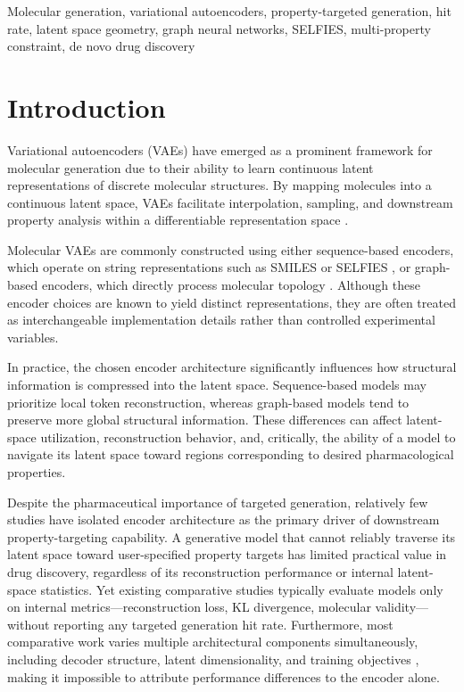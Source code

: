 \documentclass[conference]{IEEEtran}
\begin{document}
\begin{IEEEkeywords}
Molecular generation, variational autoencoders, property-targeted generation, hit rate, latent space geometry, graph neural networks, SELFIES, multi-property constraint, de novo drug discovery
\end{IEEEkeywords}

\section{Introduction}

Variational autoencoders (VAEs) \cite{vae_original_citation} have emerged as a prominent framework for molecular generation due to their ability to learn continuous latent representations of discrete molecular structures. By mapping molecules into a continuous latent space, VAEs facilitate interpolation, sampling, and downstream property analysis within a differentiable representation space \cite{molecular_vae_review_citation}.

Molecular VAEs are commonly constructed using either sequence-based encoders, which operate on string representations such as SMILES or SELFIES \cite{selfies_citation}, or graph-based encoders, which directly process molecular topology \cite{gnn_molecular_representation_citation}. Although these encoder choices are known to yield distinct representations, they are often treated as interchangeable implementation details rather than controlled experimental variables.

In practice, the chosen encoder architecture significantly influences how structural information is compressed into the latent space. Sequence-based models may prioritize local token reconstruction, whereas graph-based models tend to preserve more global structural information. These differences can affect latent-space utilization, reconstruction behavior, and, critically, the ability of a model to navigate its latent space toward regions corresponding to desired pharmacological properties.

Despite the pharmaceutical importance of targeted generation, relatively few studies have isolated encoder architecture as the primary driver of downstream property-targeting capability. A generative model that cannot reliably traverse its latent space toward user-specified property targets has limited practical value in drug discovery, regardless of its reconstruction performance or internal latent-space statistics. Yet existing comparative studies typically evaluate models only on internal metrics---reconstruction loss, KL divergence, molecular validity---without reporting any targeted generation hit rate. Furthermore, most comparative work varies multiple architectural components simultaneously, including decoder structure, latent dimensionality, and training objectives \cite{confounding_factors_vae_citation}, making it impossible to attribute performance differences to the encoder alone.
\end{document}
